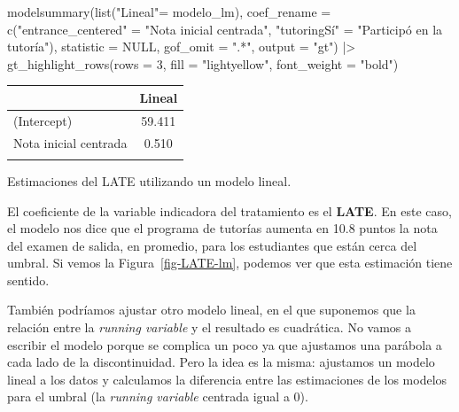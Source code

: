 \documentclass[
  letterpaper,
  DIV=11,
  numbers=noendperiod,
  oneside]{scrreprt}
\newenvironment{Shaded}{\begin{snugshade}}{\end{snugshade}}
\newcommand{\AttributeTok}[1]{\textcolor[rgb]{0.40,0.45,0.13}{#1}}
\newcommand{\ConstantTok}[1]{\textcolor[rgb]{0.56,0.35,0.01}{#1}}
\newcommand{\DecValTok}[1]{\textcolor[rgb]{0.68,0.00,0.00}{#1}}
\newcommand{\FunctionTok}[1]{\textcolor[rgb]{0.28,0.35,0.67}{#1}}
\newcommand{\NormalTok}[1]{\textcolor[rgb]{0.00,0.23,0.31}{#1}}
\newcommand{\OtherTok}[1]{\textcolor[rgb]{0.00,0.23,0.31}{#1}}
\newcommand{\SpecialCharTok}[1]{\textcolor[rgb]{0.37,0.37,0.37}{#1}}
\newcommand{\StringTok}[1]{\textcolor[rgb]{0.13,0.47,0.30}{#1}}
\begin{document}
\begin{Shaded}
\begin{Highlighting}[]
\FunctionTok{modelsummary}\NormalTok{(}\FunctionTok{list}\NormalTok{(}\StringTok{"Lineal"}\OtherTok{=}\NormalTok{ modelo\_lm),}
             \AttributeTok{coef\_rename =} \FunctionTok{c}\NormalTok{(}\StringTok{"entrance\_centered"} \OtherTok{=} \StringTok{"Nota inicial centrada"}\NormalTok{,}
                             \StringTok{"tutoringSí"} \OtherTok{=} \StringTok{"Participó en la tutoría"}\NormalTok{),}
             \AttributeTok{statistic =} \ConstantTok{NULL}\NormalTok{, }
             \AttributeTok{gof\_omit =} \StringTok{".*"}\NormalTok{,}
             \AttributeTok{output =} \StringTok{"gt"}\NormalTok{) }\SpecialCharTok{|\textgreater{}}
  \FunctionTok{gt\_highlight\_rows}\NormalTok{(}\AttributeTok{rows =} \DecValTok{3}\NormalTok{, }
                    \AttributeTok{fill =} \StringTok{"lightyellow"}\NormalTok{,}
                    \AttributeTok{font\_weight =} \StringTok{"bold"}\NormalTok{)}
\end{Highlighting}
\end{Shaded}

\begin{table}
\fontsize{12.0pt}{14.4pt}\selectfont
\begin{tabular*}{\linewidth}{@{\extracolsep{\fill}}lc}
\toprule
  & Lineal \\ 
\midrule\addlinespace[2.5pt]
(Intercept) & 59.411 \\ 
Nota inicial centrada & 0.510 \\ 
{\bfseries \cellcolor[HTML]{rgba(255,255,224,0.8)}{\textcolor[HTML]{000000}{Participó en la tutoría}}} & {\bfseries \cellcolor[HTML]{rgba(255,255,224,0.8)}{\textcolor[HTML]{000000}{10.800}}} \\ 
\bottomrule
\end{tabular*}
\end{table}

Estimaciones del LATE utilizando un modelo lineal.

El coeficiente de la variable indicadora del tratamiento es el
\textbf{LATE}. En este caso, el modelo nos dice que el programa de
tutorías aumenta en 10.8 puntos la nota del examen de salida, en
promedio, para los estudiantes que están cerca del umbral. Si vemos la
Figura~\ref{fig-LATE-lm}, podemos ver que esta estimación tiene sentido.

También podríamos ajustar otro modelo lineal, en el que suponemos que la relación
entre la \emph{running variable} y el resultado es cuadrática. No vamos
a escribir el modelo porque se complica un poco ya que ajustamos una
parábola a cada lado de la discontinuidad. Pero la idea es la misma:
ajustamos un modelo lineal a los datos y calculamos la diferencia entre
las estimaciones de los modelos para el umbral (la \emph{running
variable} centrada igual a 0).
\end{document}
